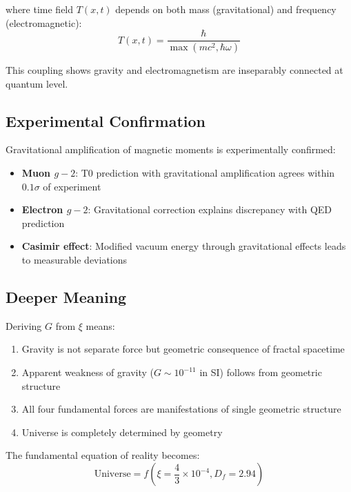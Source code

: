 \documentclass[12pt,a4paper]{article}
\theoremstyle{definition}
\begin{document}
	where time field $T(x,t)$ depends on both mass (gravitational) and frequency (electromagnetic):
	\begin{equation}
		T(x,t) = \frac{\hbar}{\max(mc^2, \hbar\omega)}
	\end{equation}
	
	This coupling shows gravity and electromagnetism are inseparably connected at quantum level.
	
	\subsection{Experimental Confirmation}
	
	Gravitational amplification of magnetic moments is experimentally confirmed:
	
	\begin{itemize}
		\item \textbf{Muon $g-2$}: T0 prediction with gravitational amplification agrees within $0.1\sigma$ of experiment
		\item \textbf{Electron $g-2$}: Gravitational correction explains discrepancy with QED prediction
		\item \textbf{Casimir effect}: Modified vacuum energy through gravitational effects leads to measurable deviations
	\end{itemize}
	
	\subsection{Deeper Meaning}
	
	Deriving $G$ from $\xi$ means:
	
	\begin{enumerate}
		\item Gravity is not separate force but geometric consequence of fractal spacetime
		\item Apparent weakness of gravity ($G \sim 10^{-11}$ in SI) follows from geometric structure
		\item All four fundamental forces are manifestations of single geometric structure
		\item Universe is completely determined by geometry
	\end{enumerate}
	
	The fundamental equation of reality becomes:
	\begin{equation}
		\boxed{\text{Universe} = f\left(\xi = \frac{4}{3} \times 10^{-4}, D_f = 2.94\right)}
	\end{equation}
	
\end{document}
